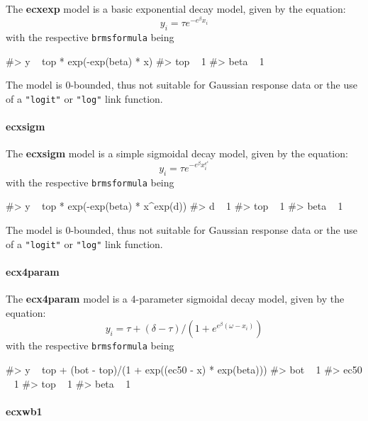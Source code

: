 The \textbf{ecxexp} model is a basic exponential decay model, given by
the equation: \[y_i = \tau e^{-e^{\beta} x_i}\] with the respective
\texttt{brmsformula} being

\begin{Schunk}
\begin{Soutput}
#> y ~ top * exp(-exp(beta) * x) 
#> top ~ 1
#> beta ~ 1
\end{Soutput}
\end{Schunk}

The model is 0-bounded, thus not suitable for Gaussian response data or
the use of a \texttt{"logit"} or \texttt{"log"} link function.

\hypertarget{ecxsigm}{%
\paragraph{ecxsigm}\label{ecxsigm}}

The \textbf{ecxsigm} model is a simple sigmoidal decay model, given by
the equation: \[y_i = \tau e^{-e^{\beta} x_i^{e^\epsilon}}\] with the
respective \texttt{brmsformula} being

\begin{Schunk}
\begin{Soutput}
#> y ~ top * exp(-exp(beta) * x^exp(d)) 
#> d ~ 1
#> top ~ 1
#> beta ~ 1
\end{Soutput}
\end{Schunk}

The model is 0-bounded, thus not suitable for Gaussian response data or
the use of a \texttt{"logit"} or \texttt{"log"} link function.

\hypertarget{ecx4param}{%
\paragraph{ecx4param}\label{ecx4param}}

The \textbf{ecx4param} model is a 4-parameter sigmoidal decay model,
given by the equation:
\[y_i = \tau + (\delta - \tau)/(1 + e^{e^{\beta} (\omega - x_i)})\] with
the respective \texttt{brmsformula} being

\begin{Schunk}
\begin{Soutput}
#> y ~ top + (bot - top)/(1 + exp((ec50 - x) * exp(beta))) 
#> bot ~ 1
#> ec50 ~ 1
#> top ~ 1
#> beta ~ 1
\end{Soutput}
\end{Schunk}

\hypertarget{ecxwb1}{%
\paragraph{ecxwb1}\label{ecxwb1}}

